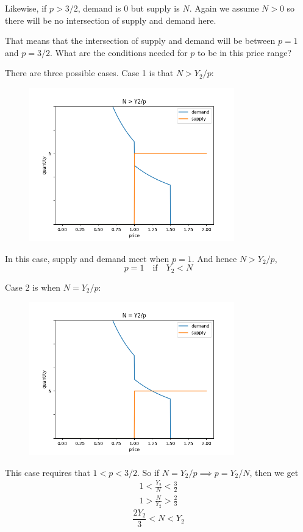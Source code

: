 \documentclass[11pt]{article}
\begin{document}
Likewise, if $p > 3/2$, demand is 0 but supply is $N$. Again we assume $N>0$ so there will be no intersection of supply and demand here. 

That means that the intersection of supply and demand will be between $p=1$ and $p=3/2$. What are the conditions needed for $p$ to be in this price range?

\newpage
There are three possible cases. Case 1 is that $N > Y_2/p$:
\begin{figure}[h]
    \centering
    \includegraphics*[width=3.5in]{equilibrium1.png}
    \label{fig:equ1}
\end{figure}
\FloatBarrier


In this case, supply and demand meet when $p=1$. And hence $N > Y_2/p$,
\begin{equation}
    p=1 \quad \text{if} \quad Y_2 < N
\end{equation}


Case 2 is when $N = Y_2/p$:

\begin{figure}[h]
    \centering
    \includegraphics*[width=3.5in]{equilibrium2.png}
    \label{fig:equ2}
\end{figure}
\FloatBarrier


This case requires that $1 < p < 3/2$. So if $N =  Y_2/p \implies p = Y_2/N$, then we get 
\begin{align*}
    1 < \frac{Y_2}{N} < \frac{3}{2}  \\
    1 > \frac{N}{Y_2} > \frac{2}{3}
\end{align*}
\begin{equation}
    \frac{2Y_2}{3} < N < Y_2
\end{equation}
\end{document}
